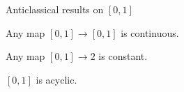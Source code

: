 \begin{frame}{Anticlassical results on $[0,1]$}
  \pause 
    \begin{corollary}
      Any map $[0,1] \to [0,1]$ is continuous. 
    \end{corollary}
    \pause 
    \begin{corollary}
      Any map $[0,1] \to 2$ is constant.
    \end{corollary}
    \pause 
    \begin{lemma}
      $[0,1]$ is acyclic. 
    \end{lemma}
\end{frame}





